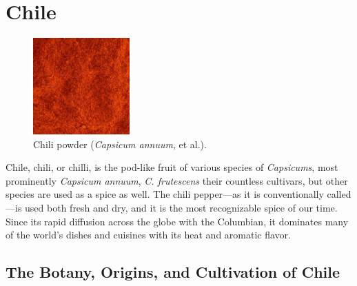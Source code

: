 \section{Chile}
\label{sec:chile}






\begin{figure}
	\vspace{-\baselineskip}
	\includegraphics[width=0.33\textwidth]{imgs/spices/chile-1.jpg}
	\caption{Chili powder (\textit{Capsicum annuum}, et al.).}
	\label{fig:chile}
\end{figure}

Chile, chili, or chilli, is the pod-like fruit of various species of \textit{Capsicums}, most prominently \textit{Capsicum annuum}, \textit{C. frutescens} their countless \glspl{cultivar}, but other species are used as a spice as well. The chili pepper---as it is conventionally called---is used both fresh and dry, and it is the most recognizable spice of our time. Since its rapid diffusion across the globe with the \gls{Columbian}, it dominates many of the world's dishes and cuisines with its heat and aromatic flavor. 

\subsection{The Botany, Origins, and Cultivation of Chile}

